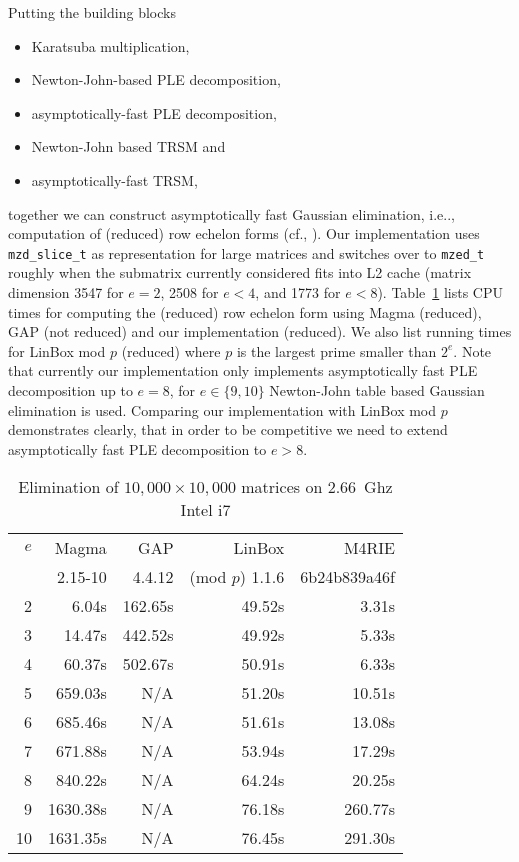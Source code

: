 \documentclass{sig-alternate}
\newcommand{\mzedt}{\texttt{mzed\-\_t}\xspace}
\newcommand{\mzdslicet}{\texttt{mzd\-\_slice\-\_t}\xspace}
\newcommand{\mycomputer}{2.66~Ghz Intel i7\xspace}
\begin{document}
Putting the building blocks
\begin{itemize}
 \item[(1)] Karatsuba multiplication,
 \item[(2)] Newton-John-based PLE decomposition,
 \item[(3)] asymp\-totic\-ally-fast PLE decomposition,
 \item[(4)] Newton-John based TRSM and
 \item[(5)] asymptotically-fast TRSM,
\end{itemize}
together we can construct asymptotically fast Gaussian elimination, i.e.., computation of (reduced) row echelon forms (cf., \cite{jeannerod-pernet-storjohann:cup2012}). Our implementation uses \mzdslicet as representation for large matrices and switches over to \mzedt roughly when the submatrix currently considered fits into L2 cache (matrix dimension 3547 for $e=2$, 2508 for $e<4$, and 1773 for $e<8$). Table~\ref{tab:echelonform} lists CPU times for computing the (reduced) row echelon form using Magma (reduced), GAP (not reduced) and our implementation (reduced). We also list running times for LinBox mod $p$ (reduced) where $p$ is the largest prime smaller than $2^e$. Note that currently our implementation only implements asymptotically fast PLE decomposition up to $e=8$, for $e\in\{9,10\}$ Newton-John table based Gaussian elimination is used. Comparing our implementation with LinBox mod $p$ demonstrates clearly, that in order to be competitive we need to extend asymptotically fast PLE decomposition to $e>8$.

\begin{table}[ht]
\begin{small}
\begin{center}
\begin{tabular}{|r|r|r|r|r|}
\hline
 $e$ & Magma & GAP & LinBox & M4RIE \\
     & {\footnotesize 2.15-10} & {\footnotesize 4.4.12} & (mod $p$) 1.1.6 & {\footnotesize 6b24b839a46f}\\
\hline
  2 &    6.04s &  162.65s & 49.52s &   3.31s\\
  3 &   14.47s &  442.52s & 49.92s &   5.33s\\
  4 &   60.37s &  502.67s & 50.91s &   6.33s\\
  5 &  659.03s &      N/A & 51.20s &  10.51s\\
  6 &  685.46s &      N/A & 51.61s &  13.08s\\
  7 &  671.88s &      N/A & 53.94s &  17.29s\\
  8 &  840.22s &      N/A & 64.24s &  20.25s\\
\hline
  9 & 1630.38s &      N/A & 76.18s & 260.77s\\
 10 & 1631.35s &      N/A & 76.45s & 291.30s\\
\hline
\end{tabular}
\end{center}
\end{small}
\caption{Elimination of $10,000 \times 10,000$ matrices on \mycomputer}
\label{tab:echelonform}
\end{table}
\end{document}
